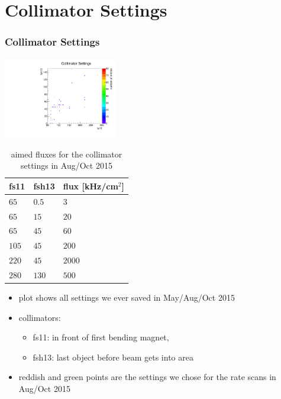 \documentclass[9pt]{beamer}
\begin{document}
\section{Collimator Settings}
\begin{frame}
	\frametitle{Collimator Settings}
	\begin{minipage}{6cm}
		\centering
		\includegraphics[angle=270, width=5cm]{CollimatorSettings}
	\end{minipage}
	\hspace*{2pt}
	\begin{minipage}{5cm}
		\begin{table}[c]
			\small
			\begin{tabular}{l|l|l}\toprule
				fs11	& fsh13	& flux [kHz/cm$^{2}$]\\\hline
				$65$	& $0.5$ & $3$\\\hline
				$65$	& $15$ & $20$\\\hline
				$65$	& $45$ & $60$\\\hline
				$105$	& $45$ & $200$\\\hline
				$220$	& $45$ & $2000$\\\hline
				$280$	& $130$ & $500$\\
				\bottomrule
			\end{tabular}
			\caption{aimed fluxes for the collimator settings in Aug/Oct 2015}
		\end{table}
	\end{minipage}
	\begin{itemize}
		\item plot shows all settings we ever saved in May/Aug/Oct 2015
		\item collimators:
		\begin{itemize}
			\item fs11: in front of first bending magnet,
			\item fsh13: last object before beam gets into area
		\end{itemize}
		\item reddish and green points are the settings we chose for the rate scans in Aug/Oct 2015
	\end{itemize}
\end{frame}
\end{document}
